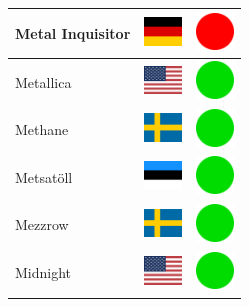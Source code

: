 \documentclass[12pt, a4paper, twoside]{report}
\begin{document}
\begin{center}
\begin{longtable}{|p{5cm}|p{2cm}|p{2cm}|}
 Metal Inquisitor                                           & \includegraphics[width=1cm]{../4x3/de} &   \includegraphics[width=1cm]{../likes/n} \\ \hline
 Metallica                                                  & \includegraphics[width=1cm]{../4x3/us} &   \includegraphics[width=1cm]{../likes/y} \\ \hline
 Methane                                                    & \includegraphics[width=1cm]{../4x3/se} &   \includegraphics[width=1cm]{../likes/y} \\ \hline
 Metsatöll                                                  & \includegraphics[width=1cm]{../4x3/ee} &   \includegraphics[width=1cm]{../likes/y} \\ \hline
 Mezzrow                                                    & \includegraphics[width=1cm]{../4x3/se} &   \includegraphics[width=1cm]{../likes/y} \\ \hline
 Midnight                                                   & \includegraphics[width=1cm]{../4x3/us} &   \includegraphics[width=1cm]{../likes/y} \\ \hline

\end{longtable}
\end{center}
\end{document}

